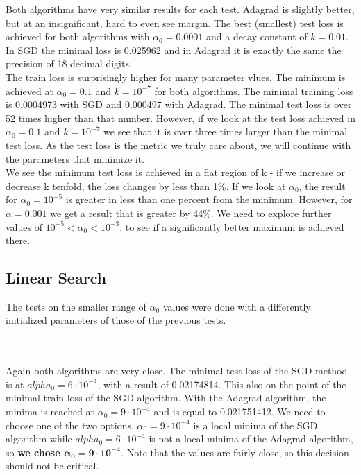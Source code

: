 \documentclass[12pt]{scrartcl}
\begin{document}
Both algorithms have very similar results for each test. Adagrad is slightly better, but at an insignificant, hard to even see margin. The best (smallest) test loss is achieved for both algorithms with $\alpha_0 = 0.0001$ and a decay constant of $k=0.01$. In SGD the minimal loss is 0.025962 and in Adagrad it is exactly the same the precision of 18 decimal digits.\\
The train loss is surprisingly higher for many parameter vlues. The minimum is achieved at $\alpha_0=0.1$ and $k=10^{-7}$ for both algorithms. The minimal training loss is 0.0004973 with SGD and 0.000497 with Adagrad. The minimal test loss is over 52 times higher than that number. However, if we look at the test loss achieved in $\alpha_0=0.1$ and $k=10^{-7}$ we see that it is over three times larger than the minimal test loss. As the test loss is the metric we truly care about, we will continue with the parameters that minimize it.\\
We see the minimum test loss is achieved in a flat region of k - if we increase or decrease k tenfold, the loss changes by less than 1\%. If we look at $\alpha_0$, the result for $\alpha_0=10^{-5}$ is greater in less than one percent from the minimum. However, for $\alpha=0.001$ we get a result that is greater by 44\%. We need to explore further values of $10^{-5} < \alpha_0 < 10^{-3}$, to see if a significantly better maximum is achieved there.

\subsection{Linear Search}
The tests on the smaller range of $\alpha_0$ values were done with a differently initialized parameters of those of the previous tests.


\\ \\

Again both algorithms are very close. The minimal test loss of the SGD method is at $alpha_0 = 6\cdot 10^{-4}$, with a result of 0.02174814. This also on the point of the minimal train loss of the SGD algorithm. With the Adagrad algorithm, the minima is reached at $\alpha_0 = 9\cdot 10^{-4}$ and is equal to 0.021751412. We need to choose one of the two options. $\alpha_0 = 9\cdot 10^{-4}$ is a local minima of the SGD algorithm while $alpha_0 = 6\cdot 10^{-4}$ is not a local minima of the Adagrad algorithm, so \textbf{we chose $\bm{\alpha_0 = 9\cdot 10^{-4}}$}. Note that the values are fairly close, so this decision should not be critical.
\end{document}
